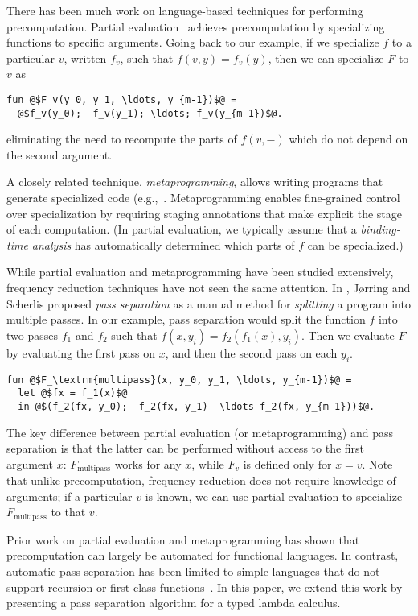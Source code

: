 There has been much work on language-based techniques for performing
precomputation. Partial evaluation~\cite{futamura71,jones96} achieves
precomputation by specializing functions to specific arguments. Going back to
our example, if we specialize $f$ to a particular $v$, written $f_v$, such that
$f(v,y) = f_v(y)$, then we can specialize $F$ to $v$ as
\begin{lstlisting}
fun @$F_v(y_0, y_1, \ldots, y_{m-1})$@ = 
  @$f_v(y_0);  f_v(y_1); \ldots; f_v(y_{m-1})$@.
\end{lstlisting}
eliminating the need to recompute the parts of $f(v,-)$ which do not depend on
the second argument.

A closely related technique, {\em metaprogramming}, allows writing
programs that generate specialized code
(e.g.,~\cite{davies96,Taha97,DP01-modal,NP05-nn}. Metaprogramming
enables fine-grained control over specialization by requiring staging
annotations that make explicit the stage of each computation. (In
partial evaluation, we typically assume that a \emph{binding-time
  analysis} has automatically determined which parts of $f$ can be
specialized.)

While partial evaluation and metaprogramming have been studied extensively,
frequency reduction techniques have not seen the same attention. In
\cite{JS86-staging}, J{\o}rring and Scherlis proposed {\em pass separation} as a
manual method for {\em splitting} a program into multiple passes.
%
In our example, pass separation would split the function $f$ into two passes
$f_1$ and $f_2$ such that $f(x,y_i) = f_2(f_1(x),y_i)$. Then we evaluate $F$ by
evaluating the first pass on $x$, and then the second pass on each $y_i$.
%
\begin{lstlisting}
fun @$F_\textrm{multipass}(x, y_0, y_1, \ldots, y_{m-1})$@ = 
  let @$fx = f_1(x)$@
  in @$(f_2(fx, y_0);  f_2(fx, y_1)  \ldots f_2(fx, y_{m-1}))$@.
\end{lstlisting}
%
The key difference between partial evaluation (or metaprogramming) and
pass separation is that the latter can be performed without access to
the first argument $x$: $F_\textrm{multipass}$ works for any $x$,
while $F_v$ is defined only for $x=v$.  Note that unlike
precomputation, frequency reduction does not require knowledge of
arguments; if a particular $v$ is known, we can use partial evaluation
to specialize $F_\textrm{multipass}$ to that $v$.

Prior work on partial evaluation and metaprogramming has shown that
precomputation can largely be automated for functional languages. In contrast,
automatic pass separation has been limited to simple languages that do not
support recursion or first-class
functions~\cite{knoblock96,Proudfoot:2001,Foley:2011,He:2014}. In this paper, we
extend this work by presenting a pass separation algorithm for a typed lambda
calculus.

